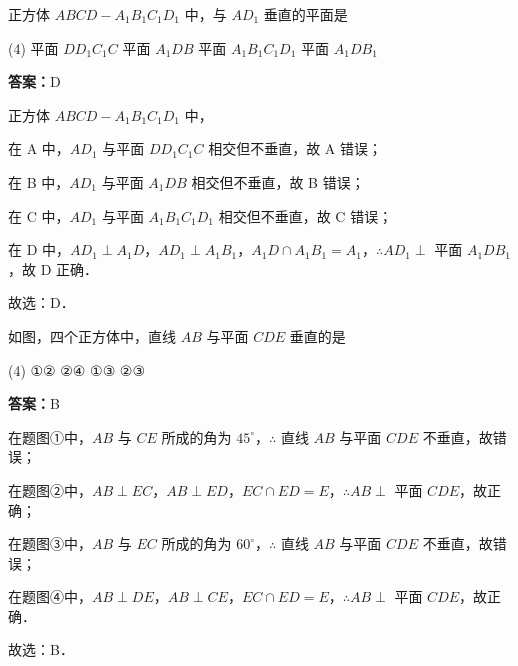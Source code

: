 \vspace{2em}

\begin{example}[\bkstar{2}{5}]
正方体 $ABCD-A_1B_1C_1D_1$ 中，与 $AD_1$ 垂直的平面是
\begin{tasks}(4)
    \task 平面 $DD_1C_1C$
    \task 平面 $A_1DB$
    \task 平面 $A_1B_1C_1D_1$
    \task 平面 $A_1DB_1$
\end{tasks}
\end{example}
\begin{solution}
\textbf{答案：}D

正方体 $ABCD-A_1B_1C_1D_1$ 中，

在 A 中，$AD_1$ 与平面 $DD_1C_1C$ 相交但不垂直，故 A 错误；

在 B 中，$AD_1$ 与平面 $A_1DB$ 相交但不垂直，故 B 错误；

在 C 中，$AD_1$ 与平面 $A_1B_1C_1D_1$ 相交但不垂直，故 C 错误；

在 D 中，$AD_1\perp A_1D$，$AD_1\perp A_1B_1$，$A_1D\cap A_1B_1=A_1$，$\therefore AD_1\perp$ 平面 $A_1DB_1$，故 D 正确．

故选：D．
\end{solution}

\vspace{2em}

\begin{example}[\bkstar{2}{5}]
如图，四个正方体中，直线 $AB$ 与平面 $CDE$ 垂直的是
\begin{tasks}(4)
    \task ①②
    \task ②④
    \task ①③
    \task ②③
\end{tasks}
\end{example}
\begin{solution}
\textbf{答案：}B

在题图①中，$AB$ 与 $CE$ 所成的角为 $45^{\circ}$，$\therefore$ 直线 $AB$ 与平面 $CDE$ 不垂直，故错误；

在题图②中，$AB\perp EC$，$AB\perp ED$，$EC\cap ED=E$，$\therefore AB\perp$ 平面 $CDE$，故正确；

在题图③中，$AB$ 与 $EC$ 所成的角为 $60^{\circ}$，$\therefore$ 直线 $AB$ 与平面 $CDE$ 不垂直，故错误；

在题图④中，$AB\perp DE$，$AB\perp CE$，$EC\cap ED=E$，$\therefore AB\perp$ 平面 $CDE$，故正确．

故选：B．
\end{solution}

\vspace{2em}

